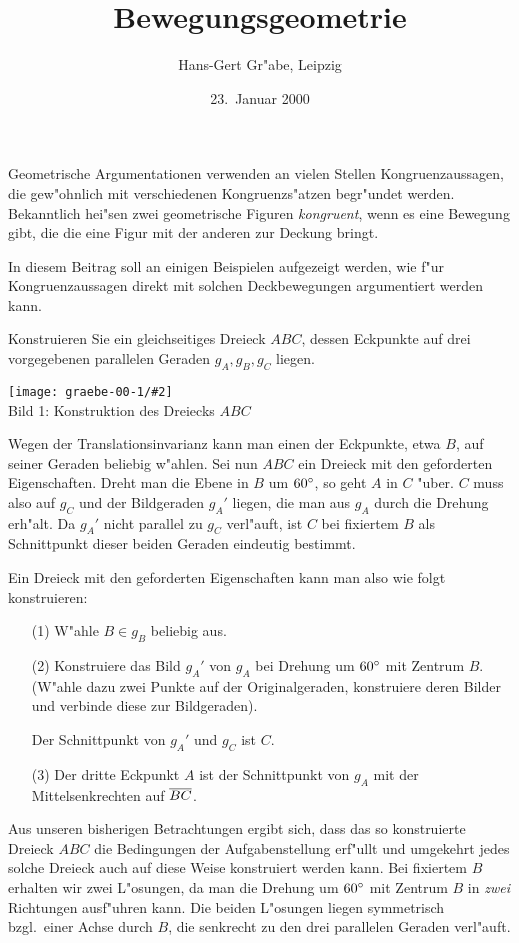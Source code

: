 \documentclass[11pt]{article}
\title{Bewegungsgeometrie\kosemnetlicensemark}
\author{Hans-Gert Gr"abe, Leipzig}
\date{23.~Januar 2000}
\newcommand{\Bild}[3]{
\begin{center}
\texttt{[image: graebe-00-1/\#2]}\nopagebreak\\[12pt] #3
\end{center}
}
\begin{document}
\maketitle

Geometrische Argumentationen verwenden an vielen Stellen Kongruenzaussagen,
die ge\-w"ohn\-lich mit verschiedenen Kongruenzs"atzen begr"undet werden.
Bekanntlich hei"sen zwei geometrische Figuren {\em kongruent}, wenn es eine
Bewegung gibt, die die eine Figur mit der anderen zur Deckung bringt.

In diesem Beitrag soll an einigen Beispielen aufgezeigt werden, wie f"ur
Kongruenzaussagen direkt mit solchen Deckbewegungen argumentiert werden kann.

\begin{aufgabe}
  Konstruieren Sie ein gleichseitiges Dreieck ${ABC}$, dessen Eckpunkte auf
  drei vorgegebenen parallelen Geraden $g_A, g_B, g_C$ liegen.
\end{aufgabe}

\Bild{width=12cm}{Bild1}{Bild 1: Konstruktion des Dreiecks $ABC$}

Wegen der Translationsinvarianz kann man einen der Eckpunkte, etwa $B$, auf
seiner Geraden beliebig w"ahlen. Sei nun $ABC$ ein Dreieck mit den geforderten
Eigenschaften. Dreht man die Ebene in $B$ um $60^{\circ}$, so geht $A$ in $C$
"uber.  $C$ muss also auf $g_C$ und der Bildgeraden $g_A'$ liegen, die man aus
$g_A$ durch die Drehung erh"alt. Da $g_A'$ nicht parallel zu $g_C$ verl"auft,
ist $C$ bei fixiertem $B$ als Schnittpunkt dieser beiden Geraden eindeutig
bestimmt.

Ein Dreieck mit den geforderten Eigenschaften kann man also wie folgt
konstruieren: 
\begin{itemize}
\item[(1)] W"ahle $B\in g_B$ beliebig aus.
\item[(2)] Konstruiere das Bild $g_A'$ von $g_A$ bei Drehung um $60^{\circ}$ mit
  Zentrum $B$. (W"ahle dazu zwei Punkte auf der Originalgeraden, konstruiere
  deren Bilder und verbinde diese zur Bildgeraden).
  
  Der Schnittpunkt von $g_A'$ und $g_C$ ist $C$.
\item[(3)] Der dritte Eckpunkt $A$ ist der Schnittpunkt von $g_A$ mit der
  Mittelsenkrechten auf $\overline{{\mathnormal{BC}}}$.
\end{itemize}

Aus unseren bisherigen Betrachtungen ergibt sich, dass das so konstruierte
Dreieck $ABC$ die Bedingungen der Aufgabenstellung erf"ullt und umgekehrt
jedes solche Dreieck auch auf diese Weise konstruiert werden kann. Bei
fixiertem $B$ erhalten wir zwei L"osungen, da man die Drehung um $60^{\circ}$ mit
Zentrum $B$ in {\em zwei} Richtungen ausf"uhren kann. Die beiden L"osungen
liegen symmetrisch bzgl.\ einer Achse durch $B$, die senkrecht zu den drei
parallelen Geraden verl"auft.
\end{document}
